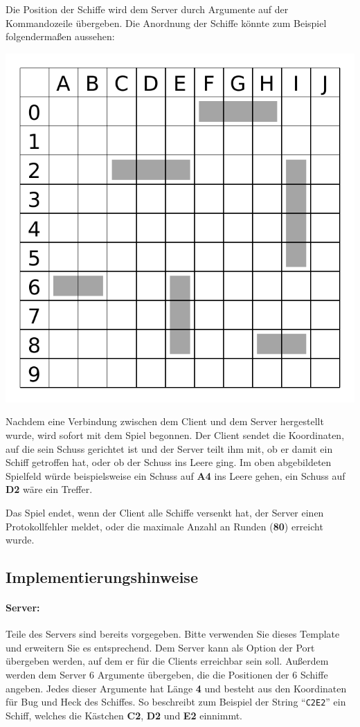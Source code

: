 Die Position der Schiffe wird dem Server durch Argumente auf der Kommandozeile
übergeben. Die Anordnung der Schiffe könnte zum Beispiel folgendermaßen aussehen:

{\centering
\includegraphics[scale=0.55]{map.pdf} \par
}

Nachdem eine Verbindung zwischen dem Client und dem Server hergestellt wurde,
wird sofort mit dem Spiel begonnen.
Der Client sendet die Koordinaten, auf die sein Schuss gerichtet ist
und der Server teilt ihm mit, ob er damit ein Schiff getroffen hat,
oder ob der Schuss ins Leere ging.
Im oben abgebildeten Spielfeld würde beispielsweise ein Schuss auf \textbf{A4} ins Leere gehen,
ein Schuss auf \textbf{D2} wäre ein Treffer.

Das Spiel endet, wenn der Client alle Schiffe versenkt hat, der Server einen
Protokollfehler meldet, oder die maximale Anzahl an Runden (\textbf{80})
erreicht wurde.

\subsection*{Implementierungshinweise}
\label{sec:implhints}
\paragraph{Server:}
Teile des Servers sind bereits vorgegeben. Bitte verwenden Sie dieses Template
und erweitern Sie es entsprechend.  Dem Server kann als Option der Port
übergeben werden, auf dem er für die Clients erreichbar sein soll.
Außerdem werden dem Server 6 Argumente übergeben, die die Positionen der 6 Schiffe angeben.
Jedes dieser Argumente hat Länge \textbf{4} und besteht aus den Koordinaten
für Bug und Heck des Schiffes. So beschreibt zum Beispiel der String ``\verb|C2E2|''
ein Schiff, welches die Kästchen \textbf{C2}, \textbf{D2} und \textbf{E2} einnimmt.

